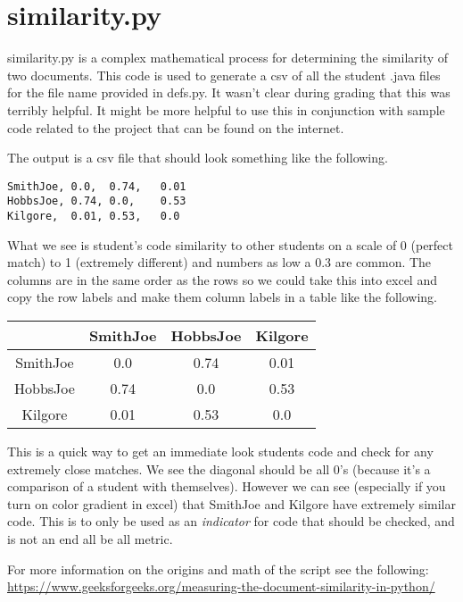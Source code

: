 \documentclass[10pt,a4paper]{book}
\begin{document}
\chapter{similarity.py}
similarity.py is a complex mathematical process for determining the similarity of two documents. This code is used to generate a csv of all the student .java files for the file name provided in defs.py. It wasn't clear during grading that this was terribly helpful. It might be more helpful to use this in conjunction with sample code related to the project that can be found on the internet.

The output is a csv file that should look something like the following.

\begin{verbatim}
SmithJoe, 0.0,	0.74,	0.01
HobbsJoe, 0.74,	0.0,	0.53
Kilgore,  0.01, 0.53,	0.0
\end{verbatim}

What we see is student's code similarity to other students on a scale of 0 (perfect match) to 1 (extremely different) and numbers as low a 0.3 are common. The columns are in the same order as the rows so we could take this into excel and copy the row labels and make them column labels in a table like the following.

\begin{center}
\begin{tabular}{ c|c|c|c| }

  & SmithJoe & HobbsJoe & Kilgore \\
  \hline
  SmithJoe & 0.0 & 0.74 & 0.01\\
  \hline
  HobbsJoe & 0.74 & 0.0 & 0.53\\
  \hline
  Kilgore  & 0.01 & 0.53 & 0.0\\
\hline
\end{tabular}
\end{center}

This is a quick way to get an immediate look students code and check for any extremely close matches. We see the diagonal should be all 0's (because it's a comparison of a student with themselves). However we can see (especially if you turn on color gradient in excel) that SmithJoe and Kilgore have extremely similar code. This is to only be used as an \emph{indicator} for code that should be checked, and is not an end all be all metric.

For more information on the origins and math of the script see the following:\\
\href{https://www.geeksforgeeks.org/measuring-the-document-similarity-in-python/}{https://www.geeksforgeeks.org/measuring-the-document-similarity-in-python/}
\end{document}
